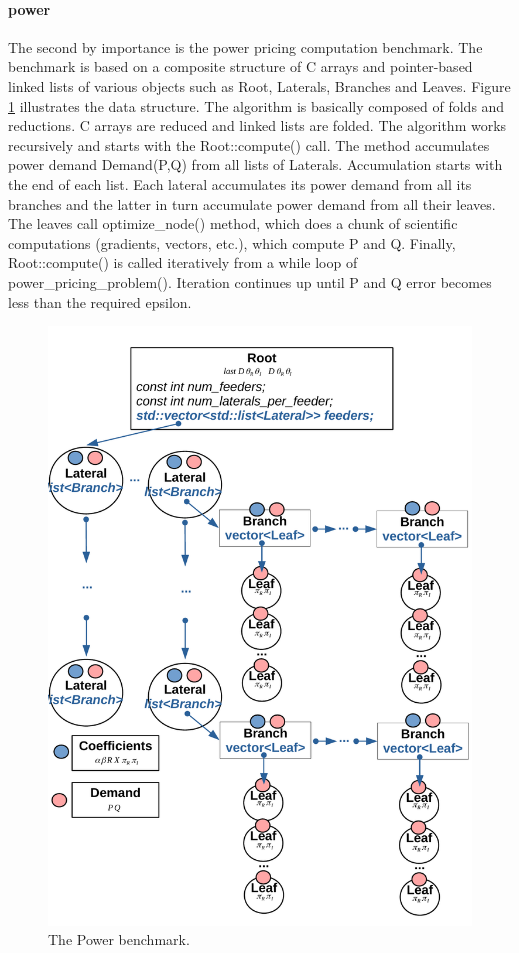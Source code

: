 \documentclass[10pt,a4paper]{report}
\begin{document}
\paragraph{power} The second by importance is the power pricing computation benchmark. The benchmark is based on a composite structure of C arrays and pointer-based linked lists of various objects such as Root, Laterals, Branches and Leaves. Figure \ref{fig:power_benchmark} illustrates the data structure. The algorithm is basically composed of folds and reductions. C arrays are reduced and linked lists are folded. The algorithm works recursively and starts with the Root::compute() call. The method accumulates power demand
Demand(P,Q) from all lists of Laterals. Accumulation starts with the end of each list. Each lateral accumulates its power demand from all its branches and the latter in turn accumulate power demand from all their leaves. The leaves call
optimize\_node() method, which does a chunk of scientific computations (gradients, vectors, etc.), which compute P and Q. Finally, Root::compute() is called iteratively from a while
loop of power\_pricing\_problem(). Iteration continues up until P and Q error becomes less than the required epsilon. 
\begin{figure}[ht]
\includegraphics[width=1.0\textwidth]{images/power_scheme.pdf}
\caption{The Power benchmark.}
\label{fig:power_benchmark}
\end{figure}
\end{document}
